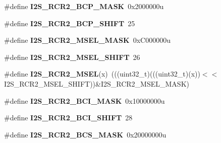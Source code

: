 \begin{DoxyCompactItemize}
\item 
\#define {\bfseries I2\+S\+\_\+\+R\+C\+R2\+\_\+\+B\+C\+P\+\_\+\+M\+A\+SK}~0x2000000u\hypertarget{group__I2S__Register__Masks_ga2131afd85c44b3770c4f13aa313255d7}{}\label{group__I2S__Register__Masks_ga2131afd85c44b3770c4f13aa313255d7}

\item 
\#define {\bfseries I2\+S\+\_\+\+R\+C\+R2\+\_\+\+B\+C\+P\+\_\+\+S\+H\+I\+FT}~25\hypertarget{group__I2S__Register__Masks_ga5ab6e46c9fe897adc5d9205c5eed1af4}{}\label{group__I2S__Register__Masks_ga5ab6e46c9fe897adc5d9205c5eed1af4}

\item 
\#define {\bfseries I2\+S\+\_\+\+R\+C\+R2\+\_\+\+M\+S\+E\+L\+\_\+\+M\+A\+SK}~0x\+C000000u\hypertarget{group__I2S__Register__Masks_gaedf6545e7c28305ad5d4b65a439db838}{}\label{group__I2S__Register__Masks_gaedf6545e7c28305ad5d4b65a439db838}

\item 
\#define {\bfseries I2\+S\+\_\+\+R\+C\+R2\+\_\+\+M\+S\+E\+L\+\_\+\+S\+H\+I\+FT}~26\hypertarget{group__I2S__Register__Masks_gad12cb75f50dddf2a5364e04a0ec59b83}{}\label{group__I2S__Register__Masks_gad12cb75f50dddf2a5364e04a0ec59b83}

\item 
\#define {\bfseries I2\+S\+\_\+\+R\+C\+R2\+\_\+\+M\+S\+EL}(x)~(((uint32\+\_\+t)(((uint32\+\_\+t)(x))$<$$<$I2\+S\+\_\+\+R\+C\+R2\+\_\+\+M\+S\+E\+L\+\_\+\+S\+H\+I\+FT))\&I2\+S\+\_\+\+R\+C\+R2\+\_\+\+M\+S\+E\+L\+\_\+\+M\+A\+SK)\hypertarget{group__I2S__Register__Masks_gae884163868d00afe144cc15cfd48936b}{}\label{group__I2S__Register__Masks_gae884163868d00afe144cc15cfd48936b}

\item 
\#define {\bfseries I2\+S\+\_\+\+R\+C\+R2\+\_\+\+B\+C\+I\+\_\+\+M\+A\+SK}~0x10000000u\hypertarget{group__I2S__Register__Masks_ga38210c72a39c29ee6ce38ff654c471cb}{}\label{group__I2S__Register__Masks_ga38210c72a39c29ee6ce38ff654c471cb}

\item 
\#define {\bfseries I2\+S\+\_\+\+R\+C\+R2\+\_\+\+B\+C\+I\+\_\+\+S\+H\+I\+FT}~28\hypertarget{group__I2S__Register__Masks_gae2c819f98fdcd09a87ed34dd47b5fb4b}{}\label{group__I2S__Register__Masks_gae2c819f98fdcd09a87ed34dd47b5fb4b}

\item 
\#define {\bfseries I2\+S\+\_\+\+R\+C\+R2\+\_\+\+B\+C\+S\+\_\+\+M\+A\+SK}~0x20000000u\hypertarget{group__I2S__Register__Masks_gae4983d1c1366069cf6e768f5fefe84ff}{}\label{group__I2S__Register__Masks_gae4983d1c1366069cf6e768f5fefe84ff}


\end{DoxyCompactItemize}
